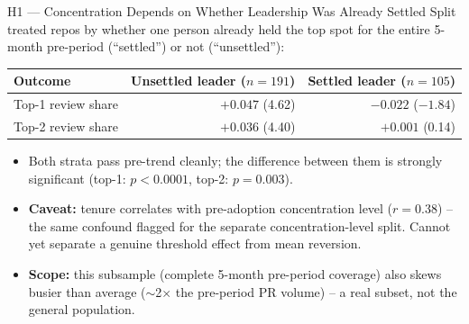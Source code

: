 \begin{frame}{H1 --- Concentration Depends on Whether Leadership Was Already Settled}
Split treated repos by whether one person already held the top spot for
the entire 5-month pre-period (``settled'') or not (``unsettled''):
\begin{table}
\centering
\small
\begin{tabular}{lrr}
\toprule
Outcome & Unsettled leader ($n{=}191$) & Settled leader ($n{=}105$) \\
\midrule
Top-1 review share & $+0.047$ (4.62) & $-0.022$ ($-1.84$) \\
Top-2 review share & $+0.036$ (4.40) & $+0.001$ (0.14) \\
\bottomrule
\end{tabular}
\end{table}
\begin{itemize}
  \item Both strata pass pre-trend cleanly; the difference between them
        is strongly significant (top-1: $p<0.0001$, top-2: $p=0.003$).
  \item \textbf{Caveat:} tenure correlates with pre-adoption
        concentration level ($r=0.38$) -- the same confound flagged for
        the separate concentration-level split. Cannot yet separate a
        genuine threshold effect from mean reversion.
  \item \textbf{Scope:} this subsample (complete 5-month pre-period
        coverage) also skews busier than average ($\sim$2$\times$ the
        pre-period PR volume) -- a real subset, not the general
        population.
\end{itemize}
\end{frame}

